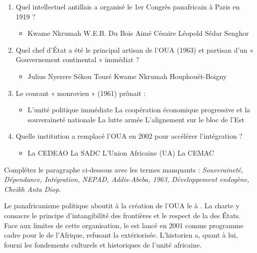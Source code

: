 \documentclass[11pt]{article}
\begin{document}
\begin{exercice}
\begin{enumerate}
    \item Quel intellectuel antillais a organisé le 1er Congrès panafricain à Paris en 1919 ?
    \begin{itemize}
        \item[A] Kwame Nkrumah \quad [B] W.E.B. Du Bois \quad [C] Aimé Césaire \quad [D] Léopold Sédar Senghor
    \end{itemize}
    \item Quel chef d'État a été le principal artisan de l'OUA (1963) et partisan d'un « Gouvernement continental » immédiat ?
    \begin{itemize}
        \item[A] Julius Nyerere \quad [B] Sékou Touré \quad [C] Kwame Nkrumah \quad [D] Houphouët-Boigny
    \end{itemize}
    \item Le courant « monrovien » (1961) prônait :
    \begin{itemize}
        \item[A] L'unité politique immédiate \quad [B] La coopération économique progressive et la souveraineté nationale \quad [C] La lutte armée \quad [D] L'alignement sur le bloc de l'Est
    \end{itemize}
    \item Quelle institution a remplacé l'OUA en 2002 pour accélérer l'intégration ?
    \begin{itemize}
        \item[A] La CEDEAO \quad [B] La SADC \quad [C] L'Union Africaine (UA) \quad [D] La CEMAC
    \end{itemize}
\end{enumerate}
\end{exercice}

\begin{exercice}
Complétez le paragraphe ci-dessous avec les termes manquants : \textit{Souveraineté, Dépendance, Intégration, NEPAD, Addis-Abeba, 1963, Développement endogène, Cheikh Anta Diop}.

Le panafricanisme politique aboutit à la création de l'OUA le \underline{\hspace{3cm}} à \underline{\hspace{3cm}}. La charte y consacre le principe d'intangibilité des frontières et le respect de la \underline{\hspace{3cm}} des États. Face aux limites de cette organisation, le \underline{\hspace{3cm}} est lancé en 2001 comme programme cadre pour le \underline{\hspace{3cm}} de l'Afrique, refusant la \underline{\hspace{3cm}} extériorisée. L'historien \underline{\hspace{3cm}} a, quant à lui, fourni les fondements culturels et historiques de l'unité africaine.
\end{exercice}
\end{document}
